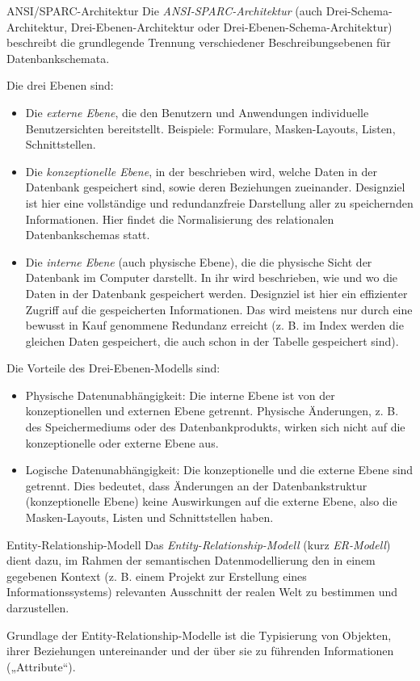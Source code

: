 \begin{defi}{ANSI/SPARC-Architektur}
    Die \emph{ANSI-SPARC-Architektur} (auch Drei-Schema-Architektur, Drei-Ebenen-Architektur oder Drei-Ebenen-Schema-Architektur) beschreibt die grundlegende Trennung verschiedener Beschreibungsebenen für Datenbankschemata.

    Die drei Ebenen sind:
    \begin{itemize}
        \item Die \emph{externe Ebene}, die den Benutzern und Anwendungen individuelle Benutzersichten bereitstellt. Beispiele: Formulare, Masken-Layouts, Listen, Schnittstellen.
        \item Die \emph{konzeptionelle Ebene}, in der beschrieben wird, welche Daten in der Datenbank gespeichert sind, sowie deren Beziehungen zueinander. Designziel ist hier eine vollständige und redundanzfreie Darstellung aller zu speichernden Informationen.
              Hier findet die Normalisierung des relationalen Datenbankschemas statt.
        \item Die \emph{interne Ebene} (auch physische Ebene), die die physische Sicht der Datenbank im Computer darstellt.
              In ihr wird beschrieben, wie und wo die Daten in der Datenbank gespeichert werden.
              Designziel ist hier ein effizienter Zugriff auf die gespeicherten Informationen.
              Das wird meistens nur durch eine bewusst in Kauf genommene Redundanz erreicht (z. B. im Index werden die gleichen Daten gespeichert, die auch schon in der Tabelle gespeichert sind).
    \end{itemize}

    Die Vorteile des Drei-Ebenen-Modells sind:
    \begin{itemize}
        \item Physische Datenunabhängigkeit: Die interne Ebene ist von der konzeptionellen und externen Ebene getrennt. Physische Änderungen, z. B. des Speichermediums oder des Datenbankprodukts, wirken sich nicht auf die konzeptionelle oder externe Ebene aus.
        \item Logische Datenunabhängigkeit: Die konzeptionelle und die externe Ebene sind getrennt.
              Dies bedeutet, dass Änderungen an der Datenbankstruktur (konzeptionelle Ebene) keine Auswirkungen auf die externe Ebene, also die Masken-Layouts, Listen und Schnittstellen haben.
    \end{itemize}
\end{defi}

\begin{defi}{Entity-Relationship-Modell}
    Das \emph{Entity-Relationship-Modell} (kurz \emph{ER-Modell}) dient dazu, im Rahmen der semantischen Datenmodellierung den in einem gegebenen Kontext (z. B. einem Projekt zur Erstellung eines Informationssystems) relevanten Ausschnitt der realen Welt zu bestimmen und darzustellen.

    Grundlage der Entity-Relationship-Modelle ist die Typisierung von Objekten, ihrer Beziehungen untereinander und der über sie zu führenden Informationen („Attribute“).
\end{defi}

